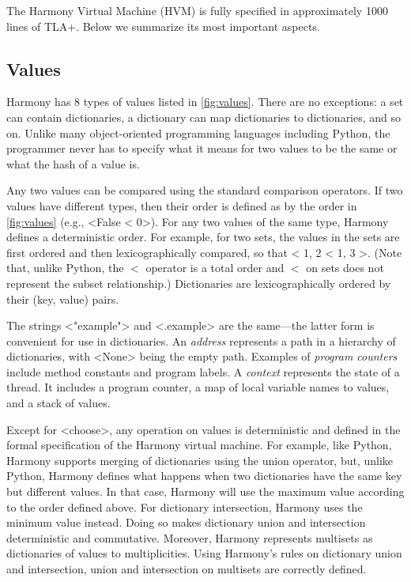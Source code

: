 \documentclass[twocolumn]{article}
\begin{document}
The Harmony Virtual Machine (HVM) is fully specified in approximately
1000 lines of TLA+.
Below we summarize its most important aspects.

\subsection{Values}

Harmony has 8 types of values listed in \autoref{fig:values}.
There are no exceptions: a set can contain dictionaries, a dictionary
can map dictionaries to dictionaries, and so on.  Unlike many
object-oriented programming languages including Python, the programmer never
has to specify what it means for two values to be the same or what the
hash of a value is.

Any two values can be compared using the standard comparison operators.
If two values have different types, then their order is defined as by
the order in \autoref{fig:values} (e.g., <{False < 0}>).
For any two values of the same type, Harmony defines a deterministic order.
For example, for two sets, the values in the sets are first ordered and
then lexicographically compared, so that <{{ 1, 2 } < { 1, 3 }}>.
(Note that, unlike Python, the $<$ operator is a total order and
$<$ on sets does not represent the subset relationship.)
Dictionaries are lexicographically ordered by their (key, value) pairs.

The strings <{"example"}> and <{.example}> are the same---the latter
form is convenient for use in dictionaries.
An \emph{address} represents a path in a hierarchy of dictionaries, with
<{None}> being the empty path.
Examples of \emph{program counters} include method constants and program labels.
A \emph{context} represents the state of a thread.  It includes a program
counter, a map of local variable names to values, and a stack of values.

Except for <{choose}>, any operation on values is deterministic and
defined in the formal specification of the Harmony virtual machine.
For example, like Python, Harmony supports merging of dictionaries
using the union operator, but, unlike Python, Harmony defines
what happens when two dictionaries have the same key but different values.
In that case, Harmony will use the maximum value according to the order
defined above.
For dictionary  intersection, Harmony uses the minimum value instead.
Doing so makes dictionary union and intersection deterministic and
commutative.  Moreover, Harmony represents multisets as dictionaries
of values to multiplicities.  Using Harmony's rules on dictionary union
and intersection, union and intersection on multisets are correctly
defined.
\end{document}
